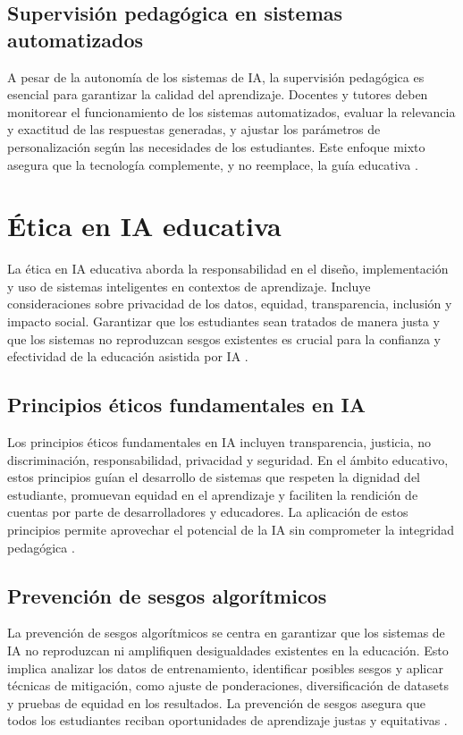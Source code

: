 \subsection{Supervisión pedagógica en sistemas automatizados}
A pesar de la autonomía de los sistemas de IA, la supervisión pedagógica es
esencial para garantizar la calidad del aprendizaje. Docentes y tutores deben
monitorear el funcionamiento de los sistemas automatizados, evaluar la
relevancia y exactitud de las respuestas generadas, y ajustar los parámetros de
personalización según las necesidades de los estudiantes. Este enfoque mixto
asegura que la tecnología complemente, y no reemplace, la guía educativa
\cite{holmes2019ai, luckin2016intelligence}.

\section{Ética en IA educativa}
La ética en IA educativa aborda la responsabilidad en el diseño, implementación
y uso de sistemas inteligentes en contextos de aprendizaje. Incluye
consideraciones sobre privacidad de los datos, equidad, transparencia,
inclusión y impacto social. Garantizar que los estudiantes sean tratados de
manera justa y que los sistemas no reproduzcan sesgos existentes es crucial
para la confianza y efectividad de la educación asistida por IA
\cite{selwyn2019should, williamson2021ethics}.

\subsection{Principios éticos fundamentales en IA}
Los principios éticos fundamentales en IA incluyen transparencia, justicia, no
discriminación, responsabilidad, privacidad y seguridad. En el ámbito
educativo, estos principios guían el desarrollo de sistemas que respeten la
dignidad del estudiante, promuevan equidad en el aprendizaje y faciliten la
rendición de cuentas por parte de desarrolladores y educadores. La aplicación
de estos principios permite aprovechar el potencial de la IA sin comprometer la
integridad pedagógica \cite{jobin2019global, floridi2018ai}.

\subsection{Prevención de sesgos algorítmicos}
La prevención de sesgos algorítmicos se centra en garantizar que los sistemas
de IA no reproduzcan ni amplifiquen desigualdades existentes en la educación.
Esto implica analizar los datos de entrenamiento, identificar posibles sesgos y
aplicar técnicas de mitigación, como ajuste de ponderaciones, diversificación
de datasets y pruebas de equidad en los resultados. La prevención de sesgos
asegura que todos los estudiantes reciban oportunidades de aprendizaje justas y
equitativas \cite{mehrabi2019survey, binns2018fairness}.

